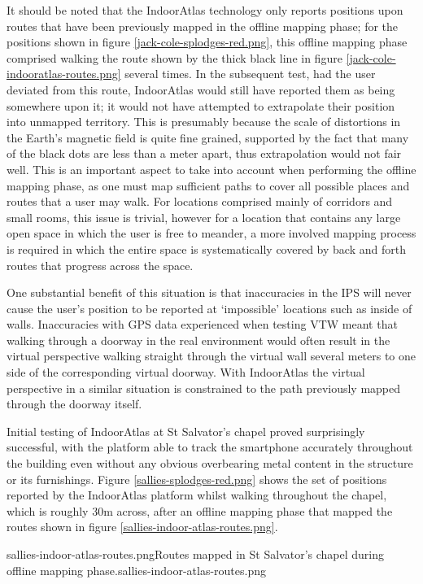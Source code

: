 It should be noted that the IndoorAtlas technology only reports positions upon routes that have been previously mapped in the offline mapping phase; for the positions shown in figure \ref{jack-cole-splodges-red.png}, this offline mapping phase comprised walking the route shown by the thick black line in figure \ref{jack-cole-indooratlas-routes.png} several times. In the subsequent test, had the user deviated from this route, IndoorAtlas would still have reported them as being somewhere upon it; it would not have attempted to extrapolate their position into unmapped territory. This is presumably because the scale of distortions in the Earth's magnetic field is quite fine grained, supported by the fact that many of the black dots are less than a meter apart, thus extrapolation would not fair well. This is an important aspect to take into account when performing the offline mapping phase, as one must map sufficient paths to cover all possible places and routes that a user may walk. For locations comprised mainly of corridors and small rooms, this issue is trivial, however for a location that contains any large open space in which the user is free to meander, a more involved mapping process is required in which the entire space is systematically covered by back and forth routes that progress across the space.

One substantial benefit of this situation is that inaccuracies in the IPS will never cause the user's position to be reported at `impossible' locations such as inside of walls. Inaccuracies with GPS data experienced when testing VTW meant that walking through a doorway in the real environment would often result in the virtual perspective walking straight through the virtual wall several meters to one side of the corresponding virtual doorway. With IndoorAtlas the virtual perspective in a similar situation is constrained to the path previously mapped through the doorway itself.

Initial testing of IndoorAtlas at St Salvator's chapel proved surprisingly successful, with the platform able to track the smartphone accurately throughout the building even without any obvious overbearing metal content in the structure or its furnishings. Figure \ref{sallies-splodges-red.png} shows the set of positions reported by the IndoorAtlas platform whilst walking throughout the chapel, which is roughly 30m across, after an offline mapping phase that mapped the routes shown in figure \ref{sallies-indoor-atlas-routes.png}.

       {sallies-indoor-atlas-routes.png}{Routes mapped in St Salvator's chapel during offline mapping phase.}{sallies-indoor-atlas-routes.png}

